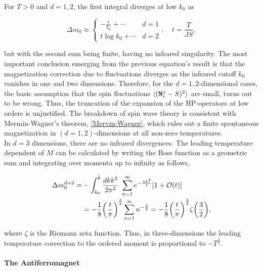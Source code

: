 For $T > 0$ and $d = 1,2$, the first integral diverges at low $k_0$ as 

\begin{equation}
    \Delta m_0 \approx \left\{ \begin{array}{cc}
        -\frac{t}{k_0} + \cdots & d=1 \\
        t \log k_0 + \cdots & d=2
    \end{array}\right., \quad t = \frac{T}{JS},
\end{equation}

but with the second sum being finite, having no infrared singularity. The most 
important conclusion emerging from the previous equation's result is that the 
magnetization correction due to fluctuations diverges as the infrared cutoff 
$k_0$ vanishes in one and two dimensions. Therefore, for the $d=1,2$-dimensional cases, the basic assumption that the spin fluctuations $\langle ({\bf S}_i^z - 
S)^2 \rangle$ are small, turns out to be wrong. Thus, the truncation of the 
expansion of the HP-operators at low orders is unjustified. The breakdown of 
spin wave theory is consistent with Mermin-Wagner's theorem, \cref{Mervin-Wagner}, which rules out a finite spontaneous magnetization in $(d=1,2)$-dimensions at all non-zero temperatures. \\

In $d = 3$ dimensions, there are no infrared divergences. The leading temperature dependent of $M$ can be calculated by writing the Bose function as a geometric sum and integrating over momenta up to infinity as follows, 

\begin{equation}
\begin{split}
    \Delta m_0^{d=3} =& - \int_{k_0}^{\bar{k}} \frac{dk k^2}{2\pi^2} \textnormal{ } \sum_{n=1}^{\infty} e^{-\frac{nk^2}{t}} [1+\mathcal{O}(t)] \\
    &= - \frac{1}{8} \bigg( \frac{t}{\pi} \bigg)^{\frac{3}{2}} \sum_{n=1}^{\infty} n^{-\frac{3}{2}} =  - \frac{1}{8} \bigg( \frac{t}{\pi} \bigg)^{\frac{3}{2}} \zeta\bigg(\frac{3}{2}\bigg),
\end{split}
\end{equation}

where $\zeta$ is the Riemann zeta function. Thus, in three-dimensions the leading temperature correction to the ordered moment is proportional to $-T^{\frac{3}{2}}$. \\

\paragraph{The Antiferromagnet}

